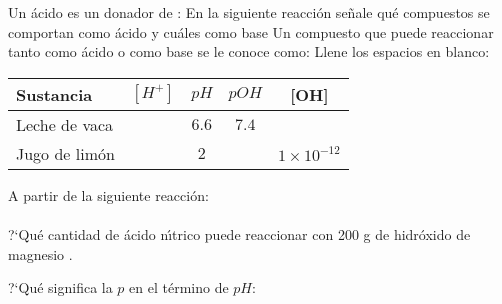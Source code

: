 \begin{exercises}
\exer Un \'acido es un donador de :\hrulefill
\exer En la siguiente reacci\'on se\~nale qu\'e compuestos se comportan como \'acido y cu\'ales como base 
\exer Un compuesto que puede reaccionar tanto como \'acido o como base se le conoce como:\hrulefill
\exer Llene los espacios en blanco:\\
\begin{tabular}{l|c|c|c|c}
Sustancia & $[H^+]$ & $pH$ & $pOH$ & [OH]\\ \hline
Leche de vaca &    & $6.6$ &$7.4$ &  \\
\hline Jugo de lim\'on & &$2$ & &$1\times10^{-12}$ \\
\hline 
\end{tabular}
\exer A partir de la siguiente reacci\'on:\\\vskip 3pt \\ \vskip 3pt ?`Qu\'e cantidad de \'acido n\'{\i}trico  puede reaccionar con 200 g de hidr\'oxido de magnesio . 

\exer ?`Qu\'e significa la $p$ en el t\'ermino de $pH$:
\hrulefill
\end{exercises}

%
